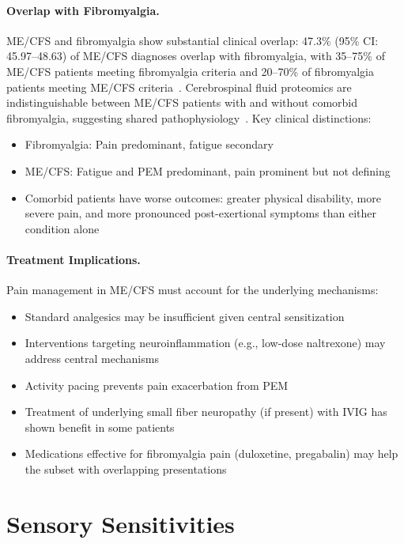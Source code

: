 \paragraph{Overlap with Fibromyalgia.}
ME/CFS and fibromyalgia show substantial clinical overlap: 47.3\% (95\% CI: 45.97--48.63) of ME/CFS diagnoses overlap with fibromyalgia, with 35--75\% of ME/CFS patients meeting fibromyalgia criteria and 20--70\% of fibromyalgia patients meeting ME/CFS criteria~\cite{Pendergrast2016overlap}. Cerebrospinal fluid proteomics are indistinguishable between ME/CFS patients with and without comorbid fibromyalgia, suggesting shared pathophysiology~\cite{Nilsson2023proteomics}. Key clinical distinctions:
\begin{itemize}
    \item Fibromyalgia: Pain predominant, fatigue secondary
    \item ME/CFS: Fatigue and PEM predominant, pain prominent but not defining
    \item Comorbid patients have worse outcomes: greater physical disability, more severe pain, and more pronounced post-exertional symptoms than either condition alone
\end{itemize}

\paragraph{Treatment Implications.}
Pain management in ME/CFS must account for the underlying mechanisms:
\begin{itemize}
    \item Standard analgesics may be insufficient given central sensitization
    \item Interventions targeting neuroinflammation (e.g., low-dose naltrexone) may address central mechanisms
    \item Activity pacing prevents pain exacerbation from PEM
    \item Treatment of underlying small fiber neuropathy (if present) with IVIG has shown benefit in some patients
    \item Medications effective for fibromyalgia pain (duloxetine, pregabalin) may help the subset with overlapping presentations
\end{itemize}

\section{Sensory Sensitivities}
\label{sec:sensory}

